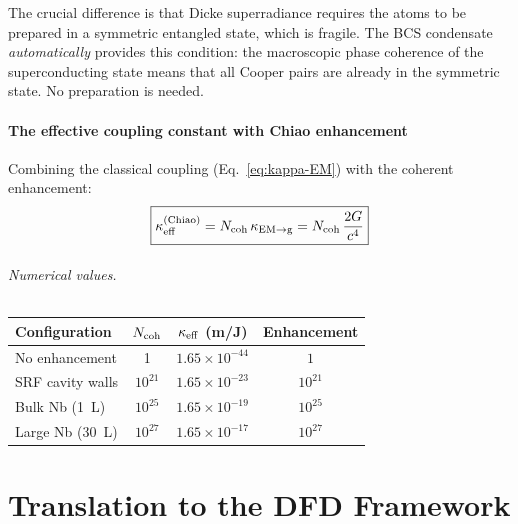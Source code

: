 \documentclass[12pt,aps,prd,twocolumn,superscriptaddress,nofootinbib]{revtex4-2}
\newcommand{\ee}[1]{\times 10^{#1}}
\begin{document}
The crucial difference is that Dicke superradiance requires the atoms
to be prepared in a symmetric entangled state, which is fragile. The
BCS condensate \emph{automatically} provides this condition: the
macroscopic phase coherence of the superconducting state means that
all Cooper pairs are already in the symmetric state. No preparation
is needed.

\subsection{The effective coupling constant with Chiao enhancement}

Combining the classical coupling (Eq.~\eqref{eq:kappa-EM}) with the
coherent enhancement:
\begin{equation}\label{eq:kappa-Chiao}
\boxed{
\kappa_{\rm eff}^{(\rm Chiao)} = N_{\rm coh}\,\kappa_{\rm EM\to g}
= N_{\rm coh}\,\frac{2G}{c^4}
}
\end{equation}

\paragraph{Numerical values.}

\begin{center}
\begin{tabular}{lccc}
\toprule
Configuration & $N_{\rm coh}$ & $\kappa_{\rm eff}$ (m/J)
& Enhancement \\
\midrule
No enhancement & 1 & $1.65\ee{-44}$ & $1$ \\
SRF cavity walls & $10^{21}$ & $1.65\ee{-23}$ & $10^{21}$ \\
Bulk Nb (1~L) & $10^{25}$ & $1.65\ee{-19}$ & $10^{25}$ \\
Large Nb (30~L) & $10^{27}$ & $1.65\ee{-17}$ & $10^{27}$ \\
\bottomrule
\end{tabular}
\end{center}


\part{Translation to the DFD Framework}
\end{document}
